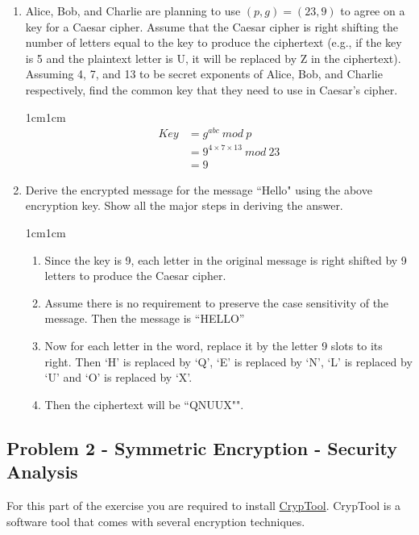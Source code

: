 \documentclass[11pt,letterpaper]{article}
\newenvironment{answer}{\em \color{blue} \begin{adjustwidth}{1cm}{1cm}}{\end{adjustwidth}}
\begin{document}
\begin{enumerate}
\begin{answer}
		\end{answer}
	\pagebreak
		\item Alice, Bob, and Charlie are planning to use $(p, g) = (23, 9)$ to agree on a key for a Caesar cipher. Assume that the Caesar cipher is right shifting the number of letters equal to the key to produce the ciphertext (e.g., if the key is 5 and the plaintext letter is U, it will be replaced by Z in the ciphertext). Assuming 4, 7, and 13 to be secret exponents of Alice, Bob, and Charlie respectively, find the common key that they need to use in Caesar's cipher.
		\begin{answer}
			\[
			\begin{split}
				Key &= g^{abc} ~mod ~p\\
				& = 9^{4 \times 7 \times 13} ~mod ~ 23\\
				& = 9
			\end{split}
			\]
		\end{answer}
		\item Derive the encrypted message for the message ``Hello" using the above encryption key.  Show all the major steps in deriving the answer.
		\begin{answer}		
		\begin{enumerate}
			\item Since the key is 9, each letter in the original message is right shifted by 9 letters to produce the Caesar cipher.
			\item  Assume there is no requirement to preserve the case sensitivity of the message. Then the message is ``HELLO''
			\item Now for each letter in the word, replace it by the letter 9 slots to its right. Then `H' is replaced by `Q', `E' is replaced by `N', `L' is replaced by `U' and `O' is replaced by `X'.
			\item  Then the ciphertext will be ``QNUUX"".
		\end{enumerate}
		\end{answer}
	\end{enumerate}
	
	\newpage 
	
	\subsection*{Problem 2 - Symmetric Encryption - Security Analysis}
	For this part of the exercise you are required to install \href{https://www.cryptool.org/en/ct1/}{CrypTool}. CrypTool is a software tool that comes with several encryption techniques.  
	
\end{document}
